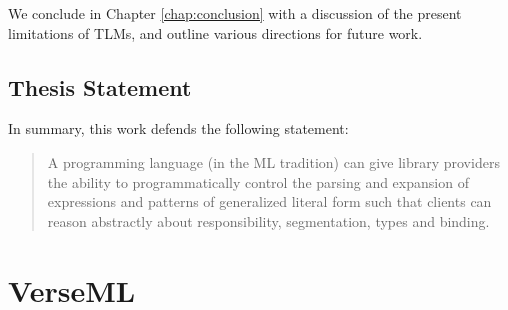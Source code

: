 
We conclude in Chapter \ref{chap:conclusion} with a discussion of the present limitations of TLMs, and outline various directions for future work.

\subsection{Thesis Statement}
In summary, this work defends the following statement:

\begin{quote}
A programming language (in the ML tradition) can give library providers the ability to %
programmatically control the parsing and expansion of expressions and patterns of generalized literal form such that clients can reason abstractly about responsibility, segmentation, types and binding. %
\end{quote}

\section{VerseML}

